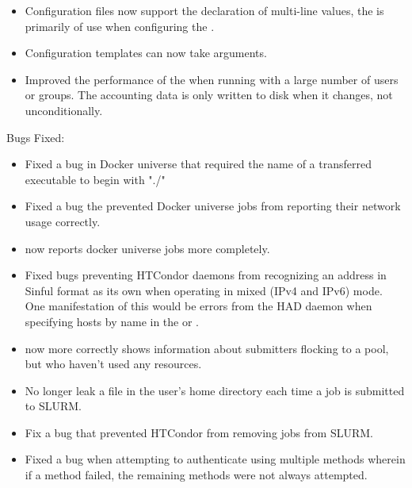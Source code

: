\begin{itemize}
\item Configuration files now support the declaration of multi-line values, the is primarily of use when
configuring the .

\item Configuration templates can now take arguments.

\item Improved the performance of the  when running
with a large number of users or groups.  The accounting data is only
written to disk when it changes, not unconditionally.

\end{itemize}

\noindent Bugs Fixed:

\begin{itemize}

\item Fixed a bug in Docker universe that required the name
of a transferred executable to begin with "./"

\item Fixed a bug the prevented Docker universe jobs from reporting
their network usage correctly.

\item {} now reports docker universe jobs more completely.

\item Fixed bugs preventing HTCondor daemons from recognizing an address in
Sinful format as its own when operating in mixed (IPv4 and IPv6) mode.  One
manifestation of this would be errors from the HAD daemon when specifying
hosts by name in the  or .

\item {} now more correctly shows information
about submitters flocking to a pool, but who haven't used 
any resources.

\item No longer leak a file in the user's home directory each time a
job is submitted to SLURM.

\item Fix a bug that prevented HTCondor from removing jobs from SLURM.

\item Fixed a bug when attempting to authenticate using multiple
methods wherein if a method failed, the remaining methods were not
always attempted.


\end{itemize}
